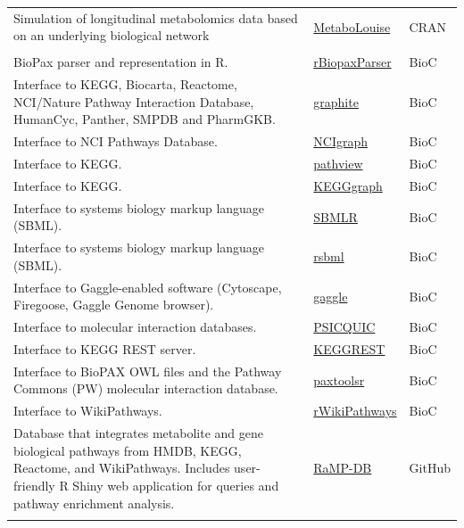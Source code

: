 \documentclass[]{article}
\begin{document}
\begin{longtable}{>{\raggedright\arraybackslash}p{30em}>{\raggedright\arraybackslash}p{10em}>{\raggedright\arraybackslash}p{3em}}
Simulation of longitudinal metabolomics data based on an underlying biological network & \href{https://cran.r-project.org/package=MetaboLouise}{MetaboLouise} & CRAN\\
\rowcolor{gray!6}  \addlinespace[0.3em]
\multicolumn{3}{l}{\textbf{Pathway resources and interfaces}}\\
BioPax parser and representation in R. & \href{https://www.bioconductor.org/packages/release/bioc/html/rBiopaxParser.html}{rBiopaxParser} & BioC\\
Interface to KEGG, Biocarta, Reactome, NCI/Nature Pathway Interaction Database, HumanCyc, Panther, SMPDB and PharmGKB. & \href{http://bioconductor.org/packages/release/bioc/html/graphite.html}{graphite} & BioC\\
\rowcolor{gray!6}  Interface to NCI Pathways Database. & \href{https://www.bioconductor.org/packages/release/bioc/html/NCIgraph.html}{NCIgraph} & BioC\\
Interface to KEGG. & \href{https://bioconductor.org/packages/release/bioc/html/pathview.html}{pathview} & BioC\\
\rowcolor{gray!6}  Interface to KEGG. & \href{https://www.bioconductor.org/packages/release/bioc/html/KEGGgraph.html}{KEGGgraph} & BioC\\
Interface to systems biology markup language (SBML). & \href{https://www.bioconductor.org/packages/release/bioc/html/SBMLR.html}{SBMLR} & BioC\\
\rowcolor{gray!6}  Interface to systems biology markup language (SBML). & \href{https://bioconductor.org/packages/release/bioc/html/rsbml.html}{rsbml} & BioC\\
Interface to Gaggle-enabled software (Cytoscape, Firegoose, Gaggle Genome browser). & \href{https://bioconductor.org/packages/release/bioc/html/gaggle.html}{gaggle} & BioC\\
\rowcolor{gray!6}  Interface to molecular interaction databases. & \href{https://www.bioconductor.org/packages/release/bioc/html/PSICQUIC.html}{PSICQUIC} & BioC\\
Interface to KEGG REST server. & \href{http://bioconductor.org/packages/release/bioc/html/KEGGREST.html}{KEGGREST} & BioC\\
\rowcolor{gray!6}  Interface to BioPAX OWL files and the Pathway Commons (PW) molecular interaction database. & \href{http://bioconductor.org/packages/release/bioc/html/paxtoolsr.html}{paxtoolsr} & BioC\\
Interface to WikiPathways. & \href{https://bioconductor.org/packages/release/bioc/html/rWikiPathways.html}{rWikiPathways} & BioC\\
\rowcolor{gray!6}  Database that integrates metabolite and gene biological pathways from HMDB, KEGG, Reactome, and WikiPathways. Includes user-friendly R Shiny web application for queries and pathway enrichment analysis. & \href{https://github.com/Mathelab/RaMP-DB/}{RaMP-DB} & GitHub\\*
\end{longtable}
\end{document}
